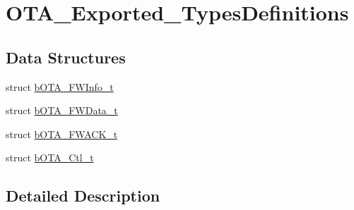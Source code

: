 \hypertarget{group___o_t_a___exported___types_definitions}{}\section{O\+T\+A\+\_\+\+Exported\+\_\+\+Types\+Definitions}
\label{group___o_t_a___exported___types_definitions}
\subsection*{Data Structures}
\begin{DoxyCompactItemize}
\item 
struct \mbox{\hyperlink{structb_o_t_a___f_w_info__t}{b\+O\+T\+A\+\_\+\+F\+W\+Info\+\_\+t}}
\item 
struct \mbox{\hyperlink{structb_o_t_a___f_w_data__t}{b\+O\+T\+A\+\_\+\+F\+W\+Data\+\_\+t}}
\item 
struct \mbox{\hyperlink{structb_o_t_a___f_w_a_c_k__t}{b\+O\+T\+A\+\_\+\+F\+W\+A\+C\+K\+\_\+t}}
\item 
struct \mbox{\hyperlink{structb_o_t_a___ctl__t}{b\+O\+T\+A\+\_\+\+Ctl\+\_\+t}}
\end{DoxyCompactItemize}


\subsection{Detailed Description}
